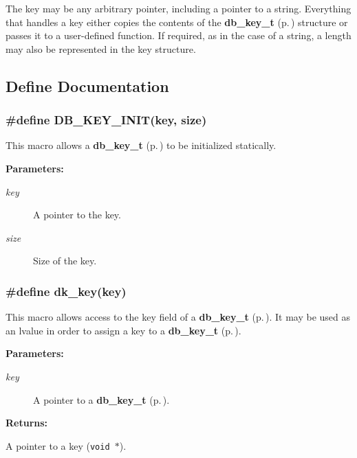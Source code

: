 The key may be any arbitrary pointer, including a pointer to a string. Everything that handles a key either copies the contents of the {\bf db\_\-key\_\-t} {\rm (p.\,\pageref{group__dbprim__key_a0})} structure or passes it to a user-defined function. If required, as in the case of a string, a length may also be represented in the key structure. 

\subsection{Define Documentation}
\subsubsection{\setlength{\rightskip}{0pt plus 5cm}\#define DB\_\-KEY\_\-INIT(key, size)}\label{group__dbprim__key_a1}




 This macro allows a {\bf db\_\-key\_\-t} {\rm (p.\,\pageref{group__dbprim__key_a0})} to be initialized statically.\begin{Desc}
\item[{\bf Parameters: }]\par
\begin{description}
\item[
{\em key}]A pointer to the key. \item[
{\em size}]Size of the key. \end{description}
\end{Desc}
\subsubsection{\setlength{\rightskip}{0pt plus 5cm}\#define dk\_\-key(key)}\label{group__dbprim__key_a2}




 This macro allows access to the key field of a {\bf db\_\-key\_\-t} {\rm (p.\,\pageref{group__dbprim__key_a0})}. It may be used as an lvalue in order to assign a key to a {\bf db\_\-key\_\-t} {\rm (p.\,\pageref{group__dbprim__key_a0})}.\begin{Desc}
\item[{\bf Parameters: }]\par
\begin{description}
\item[
{\em key}]A pointer to a {\bf db\_\-key\_\-t} {\rm (p.\,\pageref{group__dbprim__key_a0})}. \end{description}
\end{Desc}
\begin{Desc}
\item[{\bf Returns: }]\par
A pointer to a key ({\tt void $\ast$}). \end{Desc}
